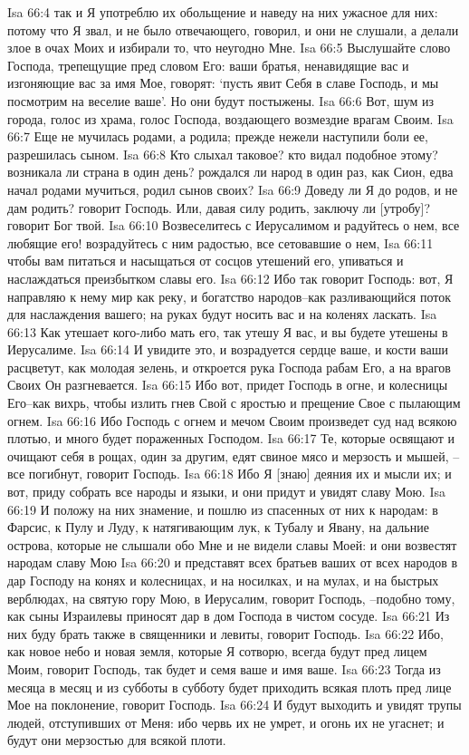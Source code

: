 Isa 66:4  так и Я употреблю их обольщение и наведу на них ужасное для них: потому что Я звал, и не было отвечающего, говорил, и они не слушали, а делали злое в очах Моих и избирали то, что неугодно Мне.
Isa 66:5  Выслушайте слово Господа, трепещущие пред словом Его: ваши братья, ненавидящие вас и изгоняющие вас за имя Мое, говорят: `пусть явит Себя в славе Господь, и мы посмотрим на веселие ваше'. Но они будут постыжены.
Isa 66:6  Вот, шум из города, голос из храма, голос Господа, воздающего возмездие врагам Своим.
Isa 66:7  Еще не мучилась родами, а родила; прежде нежели наступили боли ее, разрешилась сыном.
Isa 66:8  Кто слыхал таковое? кто видал подобное этому? возникала ли страна в один день? рождался ли народ в один раз, как Сион, едва начал родами мучиться, родил сынов своих?
Isa 66:9  Доведу ли Я до родов, и не дам родить? говорит Господь. Или, давая силу родить, заключу ли [утробу]? говорит Бог твой.
Isa 66:10  Возвеселитесь с Иерусалимом и радуйтесь о нем, все любящие его! возрадуйтесь с ним радостью, все сетовавшие о нем,
Isa 66:11  чтобы вам питаться и насыщаться от сосцов утешений его, упиваться и наслаждаться преизбытком славы его.
Isa 66:12  Ибо так говорит Господь: вот, Я направляю к нему мир как реку, и богатство народов--как разливающийся поток для наслаждения вашего; на руках будут носить вас и на коленях ласкать.
Isa 66:13  Как утешает кого-либо мать его, так утешу Я вас, и вы будете утешены в Иерусалиме.
Isa 66:14  И увидите это, и возрадуется сердце ваше, и кости ваши расцветут, как молодая зелень, и откроется рука Господа рабам Его, а на врагов Своих Он разгневается.
Isa 66:15  Ибо вот, придет Господь в огне, и колесницы Его--как вихрь, чтобы излить гнев Свой с яростью и прещение Свое с пылающим огнем.
Isa 66:16  Ибо Господь с огнем и мечом Своим произведет суд над всякою плотью, и много будет пораженных Господом.
Isa 66:17  Те, которые освящают и очищают себя в рощах, один за другим, едят свиное мясо и мерзость и мышей, --все погибнут, говорит Господь.
Isa 66:18  Ибо Я [знаю] деяния их и мысли их; и вот, приду собрать все народы и языки, и они придут и увидят славу Мою.
Isa 66:19  И положу на них знамение, и пошлю из спасенных от них к народам: в Фарсис, к Пулу и Луду, к натягивающим лук, к Тубалу и Явану, на дальние острова, которые не слышали обо Мне и не видели славы Моей: и они возвестят народам славу Мою
Isa 66:20  и представят всех братьев ваших от всех народов в дар Господу на конях и колесницах, и на носилках, и на мулах, и на быстрых верблюдах, на святую гору Мою, в Иерусалим, говорит Господь, --подобно тому, как сыны Израилевы приносят дар в дом Господа в чистом сосуде.
Isa 66:21  Из них буду брать также в священники и левиты, говорит Господь.
Isa 66:22  Ибо, как новое небо и новая земля, которые Я сотворю, всегда будут пред лицем Моим, говорит Господь, так будет и семя ваше и имя ваше.
Isa 66:23  Тогда из месяца в месяц и из субботы в субботу будет приходить всякая плоть пред лице Мое на поклонение, говорит Господь.
Isa 66:24  И будут выходить и увидят трупы людей, отступивших от Меня: ибо червь их не умрет, и огонь их не угаснет; и будут они мерзостью для всякой плоти.


